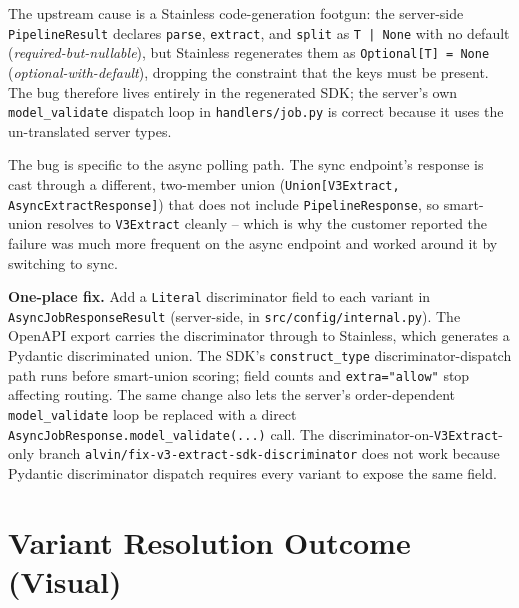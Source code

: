 \documentclass[11pt]{article}
\begin{document}
The upstream cause is a Stainless code-generation footgun: the server-side \texttt{PipelineResult} declares \texttt{parse}, \texttt{extract}, and \texttt{split} as \texttt{T | None} with no default (\emph{required-but-nullable}), but Stainless regenerates them as \texttt{Optional[T] = None} (\emph{optional-with-default}), dropping the constraint that the keys must be present. The bug therefore lives entirely in the regenerated SDK; the server's own \texttt{model\_validate} dispatch loop in \texttt{handlers/job.py} is correct because it uses the un-translated server types.

The bug is specific to the async polling path. The sync endpoint's response is cast through a different, two-member union (\texttt{Union[V3Extract, AsyncExtractResponse]}) that does not include \texttt{PipelineResponse}, so smart-union resolves to \texttt{V3Extract} cleanly -- which is why the customer reported the failure was much more frequent on the async endpoint and worked around it by switching to sync.

\textbf{One-place fix.} Add a \texttt{Literal} discriminator field to each variant in \texttt{AsyncJobResponseResult} (server-side, in \texttt{src/config/internal.py}). The OpenAPI export carries the discriminator through to Stainless, which generates a Pydantic discriminated union. The SDK's \texttt{construct\_type} discriminator-dispatch path runs before smart-union scoring; field counts and \texttt{extra="allow"} stop affecting routing. The same change also lets the server's order-dependent \texttt{model\_validate} loop be replaced with a direct \texttt{AsyncJobResponse.model\_validate(...)} call. The discriminator-on-\texttt{V3Extract}-only branch \texttt{alvin/fix-v3-extract-sdk-discriminator} does not work because Pydantic discriminator dispatch requires every variant to expose the same field.

\section{Variant Resolution Outcome (Visual)}
\end{document}
